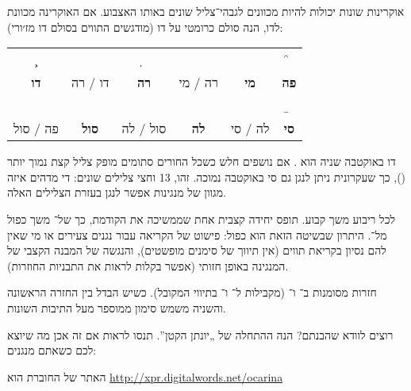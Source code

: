 אוקרינות שונות יכולות להיות מכוונים לגבהי־צליל שונים באותו האצבוע. אם האוקרינה מכוונת לדו, הנה סולם כרומטי על דו (מודגשים התווים בסולם דו מז׳ורי):

\begin{tabular}{cccccc}
	\c & \cis & \d & \dis & \e & \f\\
	\textbf{דו} &
	דו\symbolglyph{♯} / רה\symbolglyph{♭} &
	\textbf{רה} &
	רה\symbolglyph{♯} / מי\symbolglyph{♭} &
	\textbf{מי} &
	\textbf{פה}\\
	\fis & \g & \gis & \a & \ais & \b\\
	פה\symbolglyph{♯} / סול\symbolglyph{♭} &
	\textbf{סול} &
	סול\symbolglyph{♯} / לה\symbolglyph{♭} &
	\textbf{לה} &
	לה\symbolglyph{♯} / סי\symbolglyph{♭} &
	\textbf{סי}
\end{tabular}

דו באוקטבה שניה הוא \enliniatabulaturo{{\C}}. אם נושפים חלש כשכל החורים סתומים מופק צליל קצת נמוך יותר (\enliniatabulaturo{\B}), כך שעקרונית ניתן לנגן גם סי באוקטבה נמוכה. זהו, 13 וחצי צלילים שונים: די מדהים איזה מגוון של מנגינות אפשר לנגן בעזרת הצלילים האלה.

לכל ריבוע משך קבוע. \enliniatabulaturo{\z} תופס יחידה קצבית אחת שממשיכה את הקודמת, כך של־\enliniatabulaturo{\mbox{\LR{\c\z}}} משך כפול מל־\enliniatabulaturo{\c}. היתרון שבשיטה הזאת הוא כפול: פישוט של הקריאה עבור נגנים צעירים או מי שאין להם נסיון בקריאת תווים (אין תיווך של סימנים מופשטים), והנגשה של המבנה הקצבי של המנגינה באופן חזותי (אפשר בקלות לראות את התבניות החוזרות).

חזרות מסומנות ב־ ו־ (מקבילות ל־ ו־ בתיווי המקובל). כשיש הבדל בין החזרה הראשונה והשניה משמש סימון  ממוספר מעל התיבות השונות.

רוצים לוודא שהבנתם? הנה ההתחלה של „יונתן הקטן”. תנסו לראות אם זה אכן מה שיוצא לכם כשאתם מנגנים:

\begin{samepage}
	\begin{LTR}
		\takto{}{\g\e\e\z}{\x}
		\takto{}{\f\d\d\z}{\x}\par
		\takto{}{\c\d\e\f}{\x}
		\takto{}{\g\g\g\z}{\x}
	\end{LTR}
\end{samepage}




האתר של החוברת הוא \url{http://xpr.digitalwords.net/ocarina}

